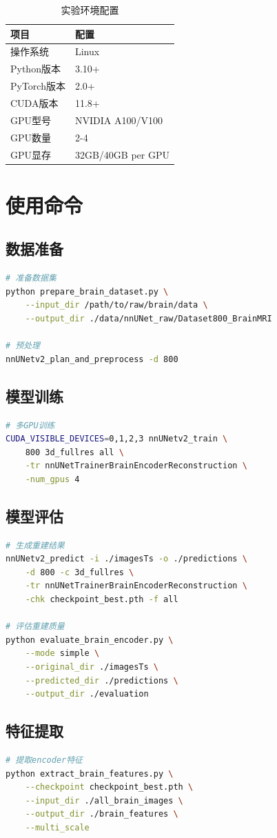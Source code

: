 \documentclass[11pt,a4paper]{article}
\begin{document}
\begin{table}[htbp]
    \centering
    \caption{实验环境配置}
    \begin{tabular}{ll}
        \toprule
        \textbf{项目} & \textbf{配置} \\
        \midrule
        操作系统 & Linux \\
        Python版本 & 3.10+ \\
        PyTorch版本 & 2.0+ \\
        CUDA版本 & 11.8+ \\
        GPU型号 & NVIDIA A100/V100 \\
        GPU数量 & 2-4 \\
        GPU显存 & 32GB/40GB per GPU \\
        \bottomrule
    \end{tabular}
\end{table}

\section{使用命令}

\subsection{数据准备}
\begin{lstlisting}[language=bash]
# 准备数据集
python prepare_brain_dataset.py \
    --input_dir /path/to/raw/brain/data \
    --output_dir ./data/nnUNet_raw/Dataset800_BrainMRI

# 预处理
nnUNetv2_plan_and_preprocess -d 800
\end{lstlisting}

\subsection{模型训练}
\begin{lstlisting}[language=bash]
# 多GPU训练
CUDA_VISIBLE_DEVICES=0,1,2,3 nnUNetv2_train \
    800 3d_fullres all \
    -tr nnUNetTrainerBrainEncoderReconstruction \
    -num_gpus 4
\end{lstlisting}

\subsection{模型评估}
\begin{lstlisting}[language=bash]
# 生成重建结果
nnUNetv2_predict -i ./imagesTs -o ./predictions \
    -d 800 -c 3d_fullres \
    -tr nnUNetTrainerBrainEncoderReconstruction \
    -chk checkpoint_best.pth -f all

# 评估重建质量
python evaluate_brain_encoder.py \
    --mode simple \
    --original_dir ./imagesTs \
    --predicted_dir ./predictions \
    --output_dir ./evaluation
\end{lstlisting}

\subsection{特征提取}
\begin{lstlisting}[language=bash]
# 提取encoder特征
python extract_brain_features.py \
    --checkpoint checkpoint_best.pth \
    --input_dir ./all_brain_images \
    --output_dir ./brain_features \
    --multi_scale
\end{lstlisting}
\end{document}
